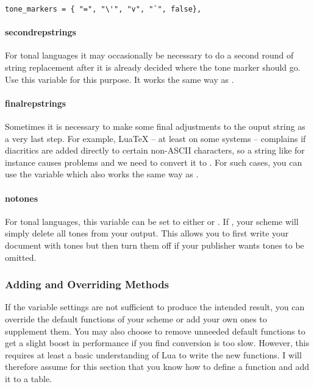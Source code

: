 \documentclass{ltxdockit}
\begin{document}
\begin{lstlisting}
tone_markers = { "=", "\'", "v", "`", false},
\end{lstlisting}

\paragraph{second\textunderscore{}rep\textunderscore{}strings}

For tonal languages it may occasionally be necessary to do a second round of
string replacement after it is already decided where the tone marker should go.
Use this variable for this purpose. It works the same way as
.

\paragraph{final\textunderscore{}rep\textunderscore{}strings}

Sometimes it is necessary to make some final adjustments to the ouput string as
a very last step. For example, LuaTeX -- at least on some systems -- complains
if diacritics are added directly to certain non-ASCII characters, so a string like
 for instance causes problems and we need to convert
it to . For such cases, you can use
the variable  which also works the same way as
.

\paragraph{no\textunderscore{}tones}

For tonal languages, this variable can be set to either  or
. If , your scheme will simply delete all tones from your
output. This allows you to first write your document with tones but then turn
them off if your publisher wants tones to be omitted.

\subsubsection{Adding and Overriding Methods}

If the variable settings are not sufficient to produce the intended result, you
can override the default functions of your scheme or add your own ones to
supplement them. You may also choose to remove unneeded default functions to get
a slight boost in performance if you find conversion is too slow. However, this
requires at least a basic understanding of Lua to write the new functions. I
will therefore assume for this section that you know how to define a function
and add it to a table.
\end{document}
